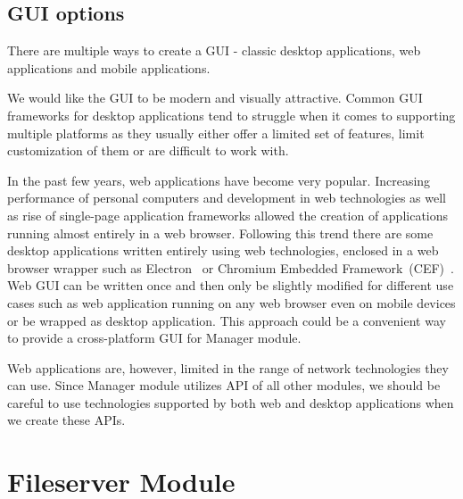 \subsection{GUI options}

There are multiple ways to create a GUI - classic desktop applications, web applications and mobile applications.
\par
We would like the GUI to be modern and visually attractive. Common GUI frameworks for desktop applications tend to struggle when it comes to supporting multiple platforms as they usually either offer a limited set of features, limit customization of them or are difficult to work with.
\par
In the past few years, web applications have become very popular. Increasing performance of personal computers and development in web technologies as well as rise of single-page application frameworks allowed the creation of applications running almost entirely in a web browser. Following this trend there are some desktop applications written entirely using web technologies, enclosed in a web browser wrapper such as Electron~\citep{electron} or Chromium Embedded Framework~(CEF)~\citep{cef}. Web GUI can be written once and then only be slightly modified for different use cases such as web application running on any web browser even on mobile devices or be wrapped as desktop application. This approach could be a convenient way to provide a cross-platform GUI for Manager module.
\par
Web applications are, however, limited in the range of network technologies they can use. Since Manager module utilizes API of all other modules, we should be careful to use technologies supported by both web and desktop applications when we create these APIs.

\section{Fileserver Module}

